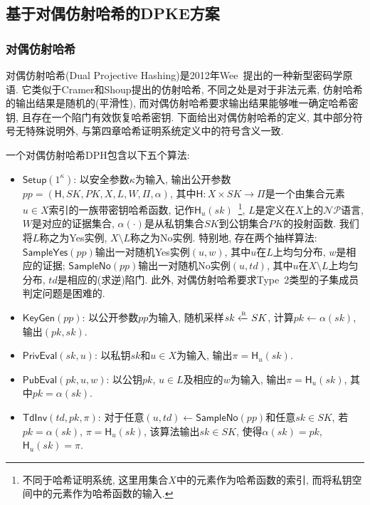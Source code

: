 \subsection{基于对偶仿射哈希的DPKE方案}
\subsubsection{对偶仿射哈希}
对偶仿射哈希(Dual Projective Hashing)是2012年Wee~\cite{Wee-EUROCRYPT-2012}提出的一种新型密码学原语. 它类似于Cramer和Shoup提出的仿射哈希, 不同之处是对于非法元素, 仿射哈希的输出结果是随机的(平滑性), 而对偶仿射哈希要求输出结果能够唯一确定哈希密钥, 且存在一个陷门有效恢复哈希密钥. 下面给出对偶仿射哈希的定义, 其中部分符号无特殊说明外, 与第四章哈希证明系统定义中的符号含义一致. 
\begin{definition}[对偶仿射哈希]\label{definition:DualHPS}
一个对偶仿射哈希$\text{DPH}$包含以下五个算法:
\begin{itemize}
\item $\mathsf{Setup}(1^\kappa)$: 以安全参数$\kappa$为输入, 输出公开参数$pp = (\mathsf{H}, SK, PK, X, L, W, \Pi, \alpha)$, 其中$\mathsf{H}: X \times SK \rightarrow \Pi$是一个由集合元素$u \in X$索引的一族带密钥哈希函数, 记作$\mathsf{H}_u(sk)$~\footnote{不同于哈希证明系统, 这里用集合$X$中的元素作为哈希函数的索引, 而将私钥空间中的元素作为哈希函数的输入.}, $L$是定义在$X$上的$\mathcal{NP}$语言, $W$是对应的证据集合, $\alpha(\cdot)$是从私钥集合$SK$到公钥集合$PK$的投射函数. 我们将$L$称之为Yes实例, $X \setminus L$称之为No实例. 特别地, 存在两个抽样算法: $\mathsf{SampleYes}(pp)$输出一对随机Yes实例$(u, w)$, 其中$u$在$L$上均匀分布, $w$是相应的证据; $\mathsf{SampleNo}(pp)$输出一对随机No实例$(u, td)$, 其中$u$在$X \setminus L$上均匀分布, $td$是相应的(求逆)陷门. 此外, 对偶仿射哈希要求Type~2类型的子集成员判定问题是困难的.

\item $\mathsf{KeyGen}(pp)$: 以公开参数$pp$为输入, 随机采样$sk \xleftarrow{\textup{\tiny R}} SK$, 计算$pk \leftarrow \alpha(sk)$, 输出$(pk, sk)$.

\item $\mathsf{PrivEval}(sk, u)$: 以私钥$sk$和$u \in X$为输入, 输出$\pi = \mathsf{H}_u(sk)$.

\item $\mathsf{PubEval}(pk, u, w)$: 以公钥$pk$, $u \in L$及相应的$w$为输入, 输出$\pi = \mathsf{H}_u(sk)$, 其中$pk = \alpha(sk)$.

\item $\mathsf{TdInv}(td, pk, \pi)$: 对于任意$(u, td) \leftarrow \mathsf{SampleNo}(pp)$和任意$sk \in SK$, 若$pk = \alpha(sk)$, $\pi = \mathsf{H}_u(sk)$, 该算法输出$sk \in SK$, 使得$\alpha(sk) = pk$, $\mathsf{H}_u(sk) = \pi$.
\end{itemize}
\end{definition} 

